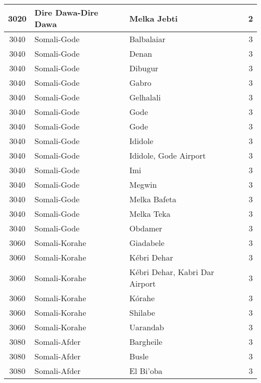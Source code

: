 \documentclass[12pt,a4paper]{report}
\begin{document}
\begin{tabular}{|c|l|l|c|}
\hline 
\rule[-1ex]{0pt}{2.5ex} 3020 & Dire Dawa-Dire Dawa & Melka Jebti & 2 \\
\hline 
\rule[-1ex]{0pt}{2.5ex} 3040 & Somali-Gode & Balbalaiar & 3 \\ 
\hline 
\rule[-1ex]{0pt}{2.5ex} 3040 & Somali-Gode & Denan & 3 \\ 
\hline 
\rule[-1ex]{0pt}{2.5ex} 3040 & Somali-Gode & Dibugur & 3 \\ 
\hline 
\rule[-1ex]{0pt}{2.5ex} 3040 & Somali-Gode & Gabro & 3 \\ 
\hline 
\rule[-1ex]{0pt}{2.5ex} 3040 & Somali-Gode & Gelhalali & 3 \\  
\hline 
\rule[-1ex]{0pt}{2.5ex} 3040 & Somali-Gode & Gode & 3 \\ 
\hline 
\rule[-1ex]{0pt}{2.5ex} 3040 & Somali-Gode & Gode & 3 \\ 
\hline 
\rule[-1ex]{0pt}{2.5ex} 3040 & Somali-Gode & Ididole & 3 \\ 
\hline 
\rule[-1ex]{0pt}{2.5ex} 3040 & Somali-Gode & Ididole, Gode Airport & 3 \\ 
\hline 
\rule[-1ex]{0pt}{2.5ex} 3040 & Somali-Gode & Imi & 3 \\ 
\hline 
\rule[-1ex]{0pt}{2.5ex} 3040 & Somali-Gode & Megwin & 3 \\ 
\hline 
\rule[-1ex]{0pt}{2.5ex} 3040 & Somali-Gode & Melka Bafeta & 3 \\ 
\hline 
\rule[-1ex]{0pt}{2.5ex} 3040 & Somali-Gode & Melka Teka & 3 \\ 
\hline 
\rule[-1ex]{0pt}{2.5ex} 3040 & Somali-Gode & Obdamer & 3 \\ 
\hline 
\rule[-1ex]{0pt}{2.5ex} 3060 & Somali-Korahe & Giadabele & 3 \\ 
\hline 
\rule[-1ex]{0pt}{2.5ex} 3060 & Somali-Korahe & K\'ebri Dehar & 3 \\ 
\hline 
\rule[-1ex]{0pt}{2.5ex} 3060 & Somali-Korahe & K\'ebri Dehar, Kabri Dar Airport & 3 \\ 
\hline 
\rule[-1ex]{0pt}{2.5ex} 3060 & Somali-Korahe & K\'orahe & 3 \\ 
\hline 
\rule[-1ex]{0pt}{2.5ex} 3060 & Somali-Korahe & Shilabe & 3 \\ 
\hline 
\rule[-1ex]{0pt}{2.5ex} 3060 & Somali-Korahe & Uarandab & 3 \\ 
\hline 
\rule[-1ex]{0pt}{2.5ex} 3080 & Somali-Afder & Bargheile & 3 \\ 
\hline 
\rule[-1ex]{0pt}{2.5ex} 3080 & Somali-Afder & Busle & 3 \\ 
\hline 
\rule[-1ex]{0pt}{2.5ex} 3080 & Somali-Afder & El Bi'oba & 3 \\ 

\end{tabular}
\end{document}
